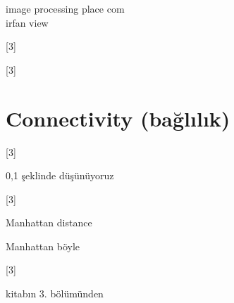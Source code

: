 \documentclass[11pt,a4paper]{article}
\begin{document}
\noindent image processing place com\\
irfan view

[3]

[3]

\section{Connectivity (bağlılık)}

[3]

0,1 şeklinde düşünüyoruz

[3]

Manhattan distance

Manhattan böyle

[3]

kitabın 3. bölümünden
\end{document}
